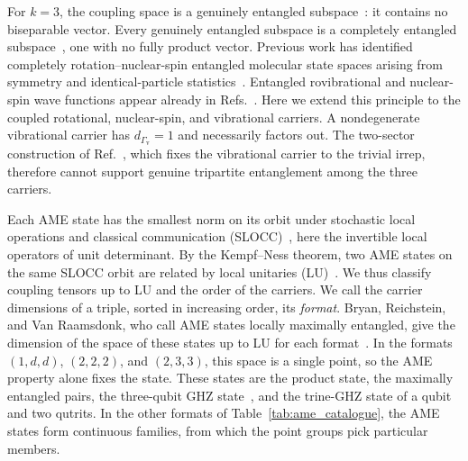 \documentclass[
  reprint,
  aps,
  prx,
  superscriptaddress,
  amsmath,
  amssymb,
  longbibliography
]{revtex4-2}
\providecommand{\Gvib}{\Gamma_{\mathrm{v}}}
\begin{document}
For $k=3$, the coupling space is a genuinely entangled subspace~\cite{Cubitt2008,Demianowicz2018}: it contains no biseparable vector. Every genuinely entangled subspace is a completely entangled subspace~\cite{Wallach2002,Parthasarathy2004,Parthasarathy2005,Walgate2008}, one with no fully product vector. Previous work has identified completely rotation--nuclear-spin entangled molecular state spaces arising from symmetry and identical-particle statistics~\cite{albert2025quantumtheorymolecularorientations}. Entangled rovibrational and nuclear-spin wave functions appear already in Refs.~\cite{Pfister1996, BordeChardonnet2000}. Here we extend this principle to the coupled rotational, nuclear-spin, and vibrational carriers. A nondegenerate vibrational carrier has $d_{\Gvib}=1$ and necessarily factors out. The two-sector construction of Ref.~\cite{albert2025quantumtheorymolecularorientations}, which fixes the vibrational carrier to the trivial irrep, therefore cannot support genuine tripartite entanglement among the three carriers.

Each AME state has the smallest norm on its orbit under stochastic local operations and classical communication (SLOCC)~\cite{PhysRevA.65.052112}, here the invertible local operators of unit determinant. By the Kempf--Ness theorem, two AME states on the same SLOCC orbit are related by local unitaries (LU)~\cite{BLRV2019}. We thus classify coupling tensors up to LU and the order of the carriers. We call the carrier dimensions of a triple, sorted in increasing order, its \emph{format}. Bryan, Reichstein, and Van Raamsdonk, who call AME states locally maximally entangled, give the dimension of the space of these states up to LU for each format~\cite{BRV2018}. In the formats $(1,d,d)$, $(2,2,2)$, and $(2,3,3)$, this space is a single point, so the AME property alone fixes the state. These states are the product state, the maximally entangled pairs, the three-qubit GHZ state~\cite{DurVidalCirac2000}, and the trine-GHZ state of a qubit and two qutrits. In the other formats of Table~\ref{tab:ame_catalogue}, the AME states form continuous families, from which the point groups pick particular members.
\end{document}
